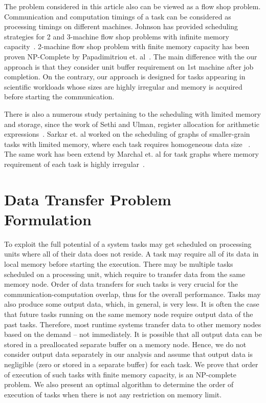 \documentclass[runningheads]{llncs} %
\begin{document}
The problem considered in this article also can be viewed as a flow shop problem. Communication and computation timings of a task can be considered as processing timings on different machines.  Johnson has provided scheduling strategies for 2 and 3-machine flow shop problems with infinite memory capacity~\cite{johnson}. 2-machine flow shop problem with finite memory capacity has been proven NP-Complete by Papadimitriou et. al~\cite{Papadimitriou:1980:FSL:322203.322213}. The main difference with the our approach is that they consider unit buffer requirement on 1st machine after job completion. On the contrary, our approach is designed for tasks appearing in scientific workloads whose sizes are highly irregular and memory is acquired before starting the communication.

There is also a numerous study pertaining to the scheduling with limited memory and storage, since the work of Sethi and Ulman, register allocation for arithmetic expressions~\cite{Sethi:1970:GOC:321607.321620}.  Sarkar et. al  worked on the scheduling of graphs of smaller-grain tasks with limited memory, where each task requires homogeneous data size ~\cite{vsarkar-pact}. The same work has been extend by Marchal et. al for task graphs where memory requirement of each task is highly irregular~\cite{loris-ipdps18}.



	\section{Data Transfer Problem Formulation}
	\label{sec:theoreticalProof}
	
	To exploit the full potential of a system tasks may get scheduled on processing
	units where all of their data does not reside. A task may require all of its data
	in local memory before starting the execution. There may be multiple tasks
	scheduled on a processing unit, which require to transfer data from the same
	memory node. Order of data transfers for such tasks is very crucial for the
	communication-computation overlap, thus for the overall performance. Tasks may
	also produce some output data, which, in general, is very less.  It is often the case that future tasks running on the same memory node require output data of the past tasks. Therefore, most runtime systems transfer data to other memory nodes based on the demand -- not immediately. It is possible that all output data can be stored in a preallocated separate buffer on a memory node. Hence, we do not consider output data separately in our analysis and assume that output data is negligible (zero or stored in a separate buffer) for each task. We prove that order of execution of such tasks with finite memory capacity, is an NP-complete problem. We also present an optimal algorithm to determine the order of execution of tasks when there is not any  restriction on memory limit.
	
\end{document}
